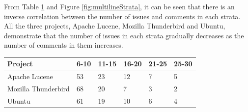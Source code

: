 \documentclass[a4paper,12pt,twoside]{report}
\begin{document}
\noindent
From Table \ref{tab:strataProportion} and Figure \ref{fig:multilineStrata}, it can be seen that there is an inverse correlation between the number of issues and comments in each strata. All the three projects, Apache Lucene, Mozilla Thunderbird and Ubuntu, demonstrate that the number of issues in each strata gradually decreases as the number of comments in them increases.
\begin{table}[H] %
    \centering
    \begin{adjustbox}{max width=\columnwidth}
    \def\arraystretch{1} %
    \begin{tabular}{p{4cm} p{2cm} p{2cm} p{2cm} p{2cm} p{2cm}}
        \toprule
        \textbf{Project} & \textbf{6-10} & \textbf{11-15} & \textbf{16-20} & \textbf{21-25} & \textbf{25-30}\\
        \midrule
			Apache Lucene & 53 & 23 & 12 & 7 & 5\\
			Mozilla Thunderbird & 68 & 20 & 7 & 3 & 2\\ 
			Ubuntu & 61 & 19 & 10 & 6 & 4\\
        \midrule
    \end{tabular}
    \end{adjustbox}
    \label{tab:strataProportion}
\end{table}
\end{document}
